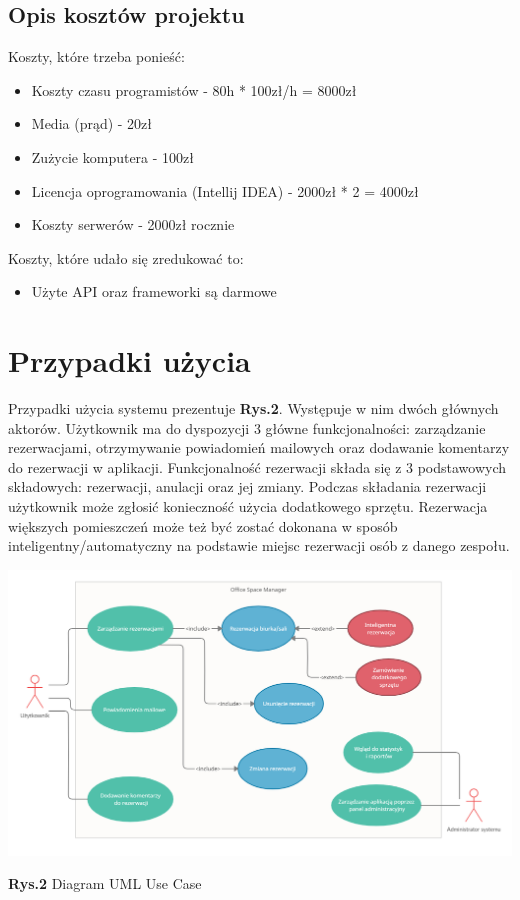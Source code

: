 \documentclass{article}
\begin{document}
\subsection{Opis kosztów projektu}
Koszty, które trzeba ponieść:
\begin{itemize}
  \item Koszty czasu programistów - 80h * 100zł/h = 8000zł
  \item Media (prąd) - 20zł
  \item Zużycie komputera - 100zł
  \item Licencja oprogramowania (Intellij IDEA) - 2000zł * 2 = 4000zł
  \item Koszty serwerów - 2000zł rocznie
\end{itemize}
Koszty, które udało się zredukować to:
\begin{itemize}
  \item Użyte API oraz frameworki są darmowe
\end{itemize}


\section{Przypadki użycia}

Przypadki użycia systemu prezentuje \textbf{Rys.2}. Występuje w nim dwóch głównych aktorów. Użytkownik ma do dyspozycji 3 główne funkcjonalności: zarządzanie rezerwacjami, otrzymywanie powiadomień mailowych oraz dodawanie komentarzy do rezerwacji w aplikacji. Funkcjonalność rezerwacji składa się z 3 podstawowych składowych: rezerwacji, anulacji oraz jej zmiany. Podczas składania rezerwacji użytkownik może zgłosić konieczność użycia dodatkowego sprzętu. Rezerwacja większych pomieszczeń może też być zostać dokonana w sposób inteligentny/automatyczny na podstawie miejsc rezerwacji osób z danego zespołu.

\hspace*{-4cm}\includegraphics[scale=0.6]{uml}
\begin{center}\textbf{Rys.2} Diagram UML Use Case \end{center}
\end{document}
